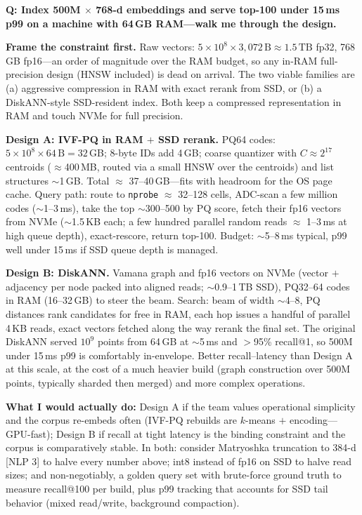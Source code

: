 \begin{interviewq}
\textbf{Q: Index 500M $\times$ 768-d embeddings and serve top-100 under 15\,ms p99 on a machine with 64\,GB RAM---walk me through the design.}

 \quad {} \quad \badgefreq{\freqhigh}

\stronganswer

\textbf{Frame the constraint first.} Raw vectors: $5 \times 10^8 \times 3{,}072\,\mathrm{B} \approx 1.5\,\mathrm{TB}$ fp32, 768\,GB fp16---an order of magnitude over the RAM budget, so any in-RAM full-precision design (HNSW included) is dead on arrival. The two viable families are (a) aggressive compression in RAM with exact rerank from SSD, or (b) a DiskANN-style SSD-resident index. Both keep a compressed representation in RAM and touch NVMe for full precision.

\textbf{Design A: IVF-PQ in RAM $+$ SSD rerank.} PQ64 codes: $5 \times 10^8 \times 64\,\mathrm{B} = 32$\,GB; 8-byte IDs add 4\,GB; coarse quantizer with $C \approx 2^{17}$ centroids ($\approx$400\,MB, routed via a small HNSW over the centroids) and list structures $\sim$1\,GB. Total $\approx$ 37--40\,GB---fits with headroom for the OS page cache. Query path: route to \texttt{nprobe} $\approx$ 32--128 cells, ADC-scan a few million codes ($\sim$1--3\,ms), take the top $\sim$300--500 by PQ score, fetch their fp16 vectors from NVMe ($\sim$1.5\,KB each; a few hundred parallel random reads $\approx$ 1--3\,ms at high queue depth), exact-rescore, return top-100. Budget: $\sim$5--8\,ms typical, p99 well under 15\,ms if SSD queue depth is managed.

\textbf{Design B: DiskANN.} Vamana graph and fp16 vectors on NVMe (vector $+$ adjacency per node packed into aligned reads; $\sim$0.9--1\,TB SSD), PQ32--64 codes in RAM (16--32\,GB) to steer the beam. Search: beam of width $\sim$4--8, PQ distances rank candidates for free in RAM, each hop issues a handful of parallel 4\,KB reads, exact vectors fetched along the way rerank the final set. The original DiskANN served $10^9$ points from 64\,GB at $\sim$5\,ms and $>$95\% recall@1, so 500M under 15\,ms p99 is comfortably in-envelope. Better recall--latency than Design A at this scale, at the cost of a much heavier build (graph construction over 500M points, typically sharded then merged) and more complex operations.

\textbf{What I would actually do:} Design A if the team values operational simplicity and the corpus re-embeds often (IVF-PQ rebuilds are $k$-means $+$ encoding---GPU-fast); Design B if recall at tight latency is the binding constraint and the corpus is comparatively stable. In both: consider Matryoshka truncation to 384-d [NLP 3] to halve every number above; int8 instead of fp16 on SSD to halve read sizes; and non-negotiably, a golden query set with brute-force ground truth to measure recall@100 per build, plus p99 tracking that accounts for SSD tail behavior (mixed read/write, background compaction).


\end{interviewq}
